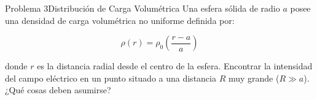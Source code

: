 \documentclass[aspectratio=169]{beamer}
\begin{document}
\begin{frame}{Problema 3}{Distribución de Carga Volumétrica}
    Una esfera sólida de radio $a$ posee una densidad de carga volumétrica no uniforme definida por:

    \begin{equation*}
        \rho(r) = \rho_0 \left( \frac{r - a}{a} \right)
    \end{equation*}

    donde $r$ es la distancia radial desde el centro de la esfera. Encontrar la intensidad del campo eléctrico en un punto situado a una distancia $R$ muy grande ($R \gg a$). ¿Qué cosas deben asumirse?
\end{frame}
\end{document}

